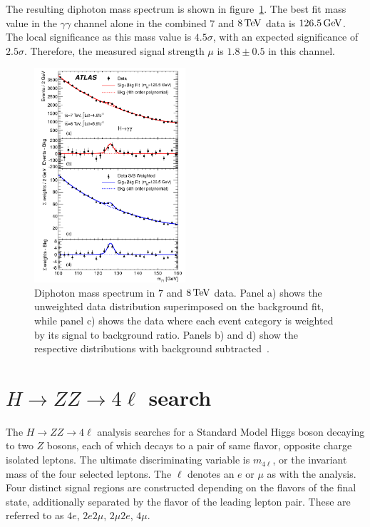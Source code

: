 The resulting diphoton mass spectrum is shown in figure~\ref{fig:disc_mgg}. The best fit mass value in the $\gamma\gamma$ channel alone in the combined $7$ and $8 \TeV$ data is $126.5 \GeV$. The local significance as this mass value is $4.5\sigma$, with an expected significance of $2.5\sigma$. Therefore, the measured signal strength $\mu$ is $1.8 \pm 0.5$ in this channel. 

\begin{figure}[h!]
  \centering
  \captionsetup{justification=centering}
  \includegraphics[width=0.5\textwidth]{figures/discovery_mgg}
  \caption{Diphoton mass spectrum in $7$ and $8 \TeV$ data. Panel a) shows the unweighted data distribution superimposed on the background fit, while panel c) shows the data where each event category is weighted by its signal to background ratio. Panels b) and d) show the respective distributions with background subtracted~\cite{Discovery}.}
  \label{fig:disc_mgg}
\end{figure}

\section{$H\to ZZ \to 4\ell$ search}

The $H\to ZZ \to 4\ell$ analysis searches for a Standard Model Higgs boson decaying to two $Z$ bosons, each of which decays to a pair of same flavor, opposite charge isolated leptons. The ultimate discriminating variable is $m_{4\ell}$, or the invariant mass of the four selected leptons. The $\ell$ denotes an $e$ or $\mu$ as with the \HWWfull analysis. Four distinct signal regions are constructed depending on the flavors of the final state, additionally separated by the flavor of the leading lepton pair. These are referred to as $4e$, $2e2\mu$, $2\mu2e$, $4\mu$. 

